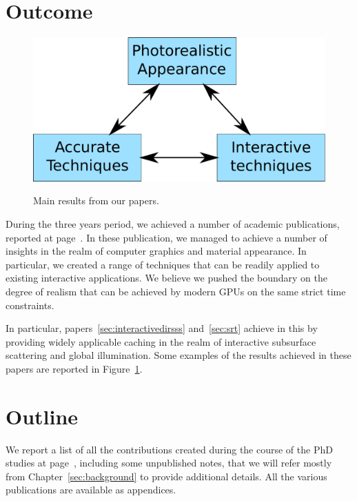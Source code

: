 \section{Outcome}

\begin{figure}
\centering
	 \includegraphics[draft,width=\textwidth]{figures/main_diagram}  \\
\caption{Main results from our papers.} 
\label{fig:main_results}
\end{figure}

During the three years period, we achieved a number of academic publications, reported at page~\pageref{sec:contributionlist}. In these publication, we managed to achieve a number of insights in the realm of computer graphics and material appearance. In particular, we created a range of techniques that can be readily applied to existing interactive applications. We believe we pushed the boundary on the degree of realism that can be achieved by modern GPUs on the same strict time constraints. 

In particular, papers~\ref{sec:interactivedirsss} and~\ref{sec:srt} achieve in this by providing widely applicable caching in the realm of interactive subsurface scattering and global illumination. Some examples of the results achieved in these papers are reported in Figure~\ref{fig:main_results}.

\section{Outline}

We report a list of all the contributions created during the course of the PhD studies at page~\pageref{sec:contributionlist}, including some unpublished notes, that we will refer mostly from Chapter~\ref{sec:background} to provide additional details. All the various publications are available as appendices. 

